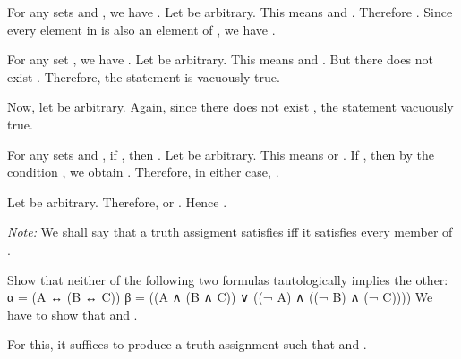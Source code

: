 \startexercises [title={\getvariable{document}{author}  \hfill  \getvariable{document}{course}  \hfill  2019-09-10}]
	
	\startexercise [title={Notes, 1.8}]
		For any sets  and , we have .
	\stopexercise
	\startsolution
		Let  be arbitrary. This means  and . Therefore . Since every element in  is also an element of , we have .
	\stopsolution

	\startexercise [title={Notes, 1.10}]
		For any set , we have .
	\stopexercise
	\startsolution
		\qquad
		Let  be arbitrary. This means  and . But there does not exist . Therefore, the statement is vacuously true.

		\qquad
		Now, let  be arbitrary. Again, since there does not exist , the statement vacuously true.
	\stopsolution

	\startexercise [title={Notes, 1.13}]
		For any sets  and , if , then .
	\stopexercise
	\startsolution
		\qquad
		Let  be arbitrary. This means  or . If , then by the condition , we obtain . Therefore, in either case, .

		\qquad
		Let  be arbitrary. Therefore,  or . Hence .
	\stopsolution

\stopexercises


\startexercises [title={\getvariable{document}{author}  \hfill  \getvariable{document}{course}  \hfill  2019-09-24}]

	\emph{Note:} We shall say that a truth assigment  satisfies  iff it satisfies every member of .
	
	\startexercise [title={Enderton, 1.2.1}]
		Show that neither of the following two formulas tautologically implies the other:
		\startformula  \startalign[align={right, left}]
			\NC  α =  \NC  (A ↔ (B ↔ C))  \NR
			\NC  β =  \NC  ((A ∧ (B ∧ C)) ∨ ((¬ A) ∧ ((¬ B) ∧ (¬ C))))  \NR
		\stopalign  \stopformula
	\stopexercise
	\startsolution
		We have to show that  and .

		\qquad
		For this, it suffices to produce a truth assignment  such that  and .

